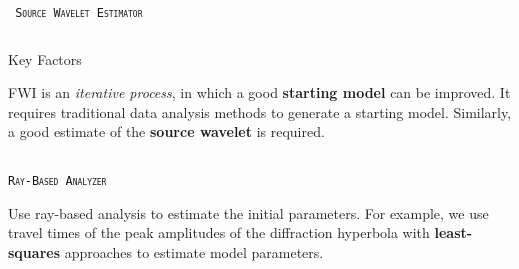 \documentclass[final]{beamer}
\newlength{\onecolwid}
\newlength{\twocolwid}
\begin{document}
\begin{frame}[t]
\begin{columns}[t]
\begin{column}{\twocolwid}
\begin{columns}[t,totalwidth=\twocolwid]
\begin{column}{\onecolwid}
\begin{block}{\textsc{\texttt{ Source Wavelet Estimator}}}
\end{block}


\end{column} %

\end{columns} %

\vspace{-1cm}
\begin{alertblock}{Key Factors}

FWI is an \textit{iterative process}, in which a good \textbf{starting model} can be improved. It requires traditional data analysis methods to generate a starting model. Similarly, a good estimate of the \textbf{source wavelet} is required.

\end{alertblock} 


\begin{columns}[t,totalwidth=\twocolwid] %

\begin{column}{\onecolwid} %


\begin{block}{\textsc{\texttt{Ray-Based Analyzer}}}

Use ray-based analysis to estimate the initial parameters. For example, we use travel times of the peak amplitudes of the diffraction hyperbola with \textbf{least-squares} approaches to estimate model parameters.  


\end{block}
\end{column}
\end{columns}
\end{column}
\end{columns}
\end{frame}
\end{document}

